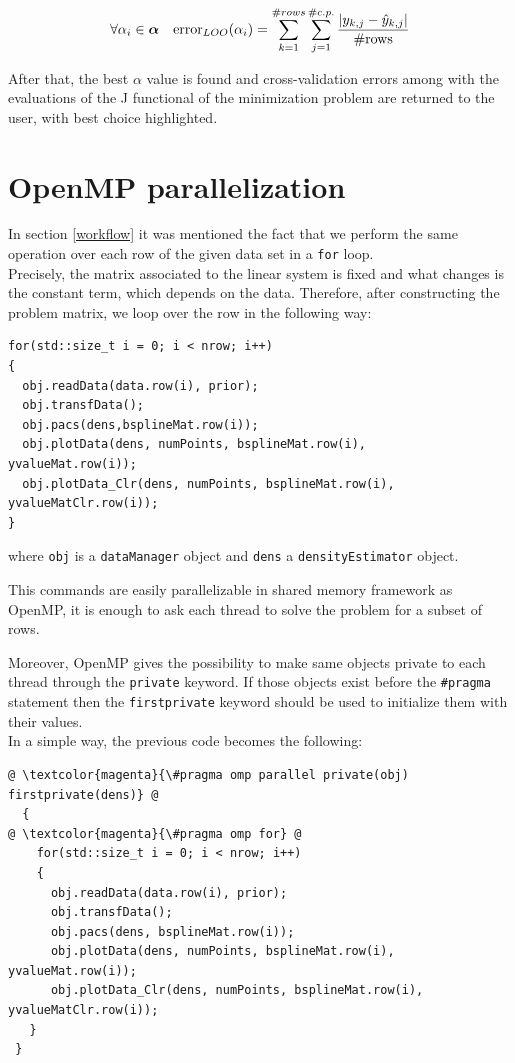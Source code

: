 \[ \forall \alpha_{i}\in\bm{\alpha}  \quad \text{error}_{LOO}(\alpha_{i}) = \sum_{k=1}^{\#rows}\sum_{j=1}^{\#c.p.} \frac{\\| y_{k,j}-\hat{y}_{k,j} \\| }{\text{\#rows}} \]

After that, the best $\alpha$ value is found and cross-validation errors among with the evaluations of the J functional of the minimization problem are returned to the user, with best choice highlighted.

\section{OpenMP parallelization} \label{openmp}
In section \ref{workflow} it was mentioned the fact that we perform the same operation over each row of the given data set in a \verb|for| loop. \\ Precisely, the matrix associated to the linear system is fixed and what changes is the constant term, which depends on the data. Therefore, after constructing the problem matrix, we loop over the row in the following way:

\begin{lstlisting}
for(std::size_t i = 0; i < nrow; i++)
{
  obj.readData(data.row(i), prior);
  obj.transfData();
  obj.pacs(dens,bsplineMat.row(i));
  obj.plotData(dens, numPoints, bsplineMat.row(i),   yvalueMat.row(i));
  obj.plotData_Clr(dens, numPoints, bsplineMat.row(i), yvalueMatClr.row(i));
}
\end{lstlisting}

where \verb|obj| is a \verb|dataManager| object and \verb|dens| a \verb|densityEstimator| object.

This commands are easily parallelizable in shared memory framework as OpenMP, it is enough to ask each thread to solve the problem for a subset of rows.

Moreover, OpenMP gives the possibility to make same objects private to each thread through the \verb|private| keyword. If those objects exist before the \verb|#pragma| statement then the \verb|firstprivate| keyword should be used to initialize them with their values. \\ In a simple way, the previous code becomes the following:

\begin{lstlisting}
@ \textcolor{magenta}{\#pragma omp parallel private(obj) firstprivate(dens)} @
  {
@ \textcolor{magenta}{\#pragma omp for} @
    for(std::size_t i = 0; i < nrow; i++)
    {
      obj.readData(data.row(i), prior);
      obj.transfData();
      obj.pacs(dens, bsplineMat.row(i));
      obj.plotData(dens, numPoints, bsplineMat.row(i), yvalueMat.row(i));
      obj.plotData_Clr(dens, numPoints, bsplineMat.row(i), yvalueMatClr.row(i));
   }
 }
\end{lstlisting}

